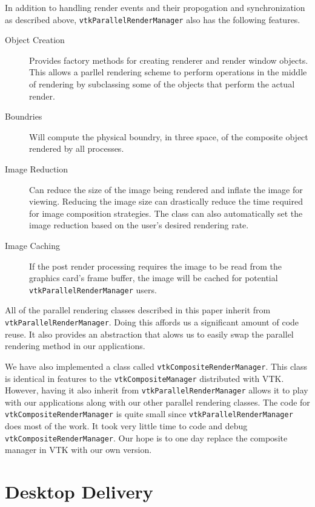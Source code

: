 \documentclass[twocolumn]{article}
\newcommand{\cidentifier}[1]{\texttt{#1}}
\begin{document}
  In addition to handling render events and their propogation and
  synchronization as described above,
  \cidentifier{vtk\-Parallel\-Render\-Manager} also has the following
  features.
  \begin{description}
    \item [Object Creation] Provides factory methods for creating renderer
      and render window objects.  This allows a parllel rendering scheme to
      perform operations in the middle of rendering by subclassing some of
      the objects that perform the actual render.
    \item [Boundries] Will compute the physical boundry, in three space, of
      the composite object rendered by all processes.
    \item [Image Reduction] Can reduce the size of the image being rendered
      and inflate the image for viewing.  Reducing the image size can
      drastically reduce the time required for image composition
      strategies.  The class can also automatically set the image reduction
      based on the user's desired rendering rate.
    \item [Image Caching] If the post render processing requires the image
      to be read from the graphics card's frame buffer, the image will be
      cached for potential \cidentifier{vtk\-Parallel\-Render\-Manager}
      users.
  \end{description}

  All of the parallel rendering classes described in this paper inherit
  from \cidentifier{vtk\-Parallel\-Render\-Manager}.  Doing this affords us
  a significant amount of code reuse.  It also provides an abstraction that
  alows us to easily swap the parallel rendering method in our
  applications.

  We have also implemented a class called
  \cidentifier{vtk\-Composite\-Render\-Manager}.  This class is identical
  in features to the \cidentifier{vtk\-Composite\-Manager} distributed with
  VTK.  However, having it also inherit from
  \cidentifier{vtk\-Parallel\-Render\-Manager} allows it to play with our
  applications along with our other parallel rendering classes.  The code
  for \cidentifier{vtk\-Composite\-Render\-Manager} is quite small since
  \cidentifier{vtk\-Parallel\-Render\-Manager} does most of the work.  It
  took very little time to code and debug
  \cidentifier{vtk\-Composite\-Render\-Manager}.  Our hope is to one day
  replace the composite manager in VTK with our own version.


  \section{Desktop Delivery}
  \label{sec:desktop_delivery}
\end{document}
